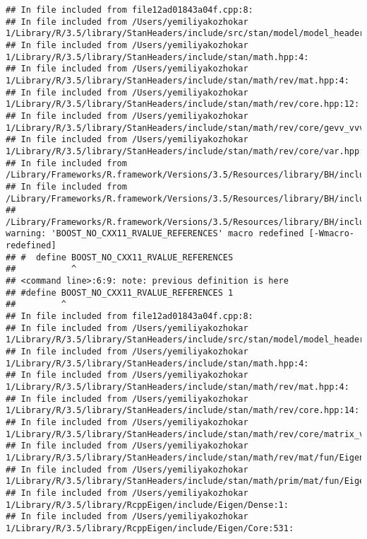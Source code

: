 \documentclass[]{article}
\begin{document}
\begin{verbatim}
## In file included from file12ad01843a04f.cpp:8:
## In file included from /Users/yemiliyakozhokar 1/Library/R/3.5/library/StanHeaders/include/src/stan/model/model_header.hpp:4:
## In file included from /Users/yemiliyakozhokar 1/Library/R/3.5/library/StanHeaders/include/stan/math.hpp:4:
## In file included from /Users/yemiliyakozhokar 1/Library/R/3.5/library/StanHeaders/include/stan/math/rev/mat.hpp:4:
## In file included from /Users/yemiliyakozhokar 1/Library/R/3.5/library/StanHeaders/include/stan/math/rev/core.hpp:12:
## In file included from /Users/yemiliyakozhokar 1/Library/R/3.5/library/StanHeaders/include/stan/math/rev/core/gevv_vvv_vari.hpp:5:
## In file included from /Users/yemiliyakozhokar 1/Library/R/3.5/library/StanHeaders/include/stan/math/rev/core/var.hpp:7:
## In file included from /Library/Frameworks/R.framework/Versions/3.5/Resources/library/BH/include/boost/math/tools/config.hpp:13:
## In file included from /Library/Frameworks/R.framework/Versions/3.5/Resources/library/BH/include/boost/config.hpp:39:
## /Library/Frameworks/R.framework/Versions/3.5/Resources/library/BH/include/boost/config/compiler/clang.hpp:200:11: warning: 'BOOST_NO_CXX11_RVALUE_REFERENCES' macro redefined [-Wmacro-redefined]
## #  define BOOST_NO_CXX11_RVALUE_REFERENCES
##           ^
## <command line>:6:9: note: previous definition is here
## #define BOOST_NO_CXX11_RVALUE_REFERENCES 1
##         ^
## In file included from file12ad01843a04f.cpp:8:
## In file included from /Users/yemiliyakozhokar 1/Library/R/3.5/library/StanHeaders/include/src/stan/model/model_header.hpp:4:
## In file included from /Users/yemiliyakozhokar 1/Library/R/3.5/library/StanHeaders/include/stan/math.hpp:4:
## In file included from /Users/yemiliyakozhokar 1/Library/R/3.5/library/StanHeaders/include/stan/math/rev/mat.hpp:4:
## In file included from /Users/yemiliyakozhokar 1/Library/R/3.5/library/StanHeaders/include/stan/math/rev/core.hpp:14:
## In file included from /Users/yemiliyakozhokar 1/Library/R/3.5/library/StanHeaders/include/stan/math/rev/core/matrix_vari.hpp:4:
## In file included from /Users/yemiliyakozhokar 1/Library/R/3.5/library/StanHeaders/include/stan/math/rev/mat/fun/Eigen_NumTraits.hpp:4:
## In file included from /Users/yemiliyakozhokar 1/Library/R/3.5/library/StanHeaders/include/stan/math/prim/mat/fun/Eigen.hpp:4:
## In file included from /Users/yemiliyakozhokar 1/Library/R/3.5/library/RcppEigen/include/Eigen/Dense:1:
## In file included from /Users/yemiliyakozhokar 1/Library/R/3.5/library/RcppEigen/include/Eigen/Core:531:

\end{verbatim}
\end{document}
